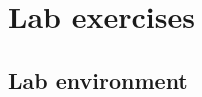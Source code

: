 \documentclass[a4paper]{article}
\begin{document}


\section{Lab exercises}

\subsection{Lab environment}
\end{document}
